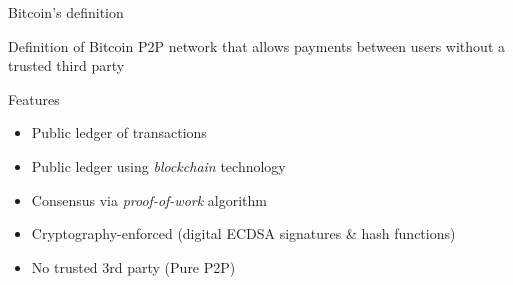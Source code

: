 \documentclass{beamer}
\begin{document}
\begin{frame}{Bitcoin's definition}
 \begin{block}{Definition of Bitcoin}
  P2P network that allows payments between users without a trusted third
  party
 \end{block}
 \pause
 \begin{block}{Features}
  \begin{itemize}[<+->]
   \item Public ledger of transactions
   \item Public ledger using \textit{blockchain} technology
   \item Consensus via \textit{proof-of-work} algorithm
   \item Cryptography-enforced (digital ECDSA signatures \& hash functions)
   \item No trusted 3rd party (Pure P2P)
  \end{itemize}
 \end{block}
\end{frame}
\end{document}
